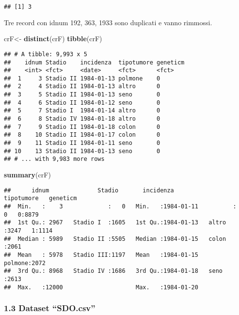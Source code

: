 \documentclass[]{article}
\newenvironment{Shaded}{\begin{snugshade}}{\end{snugshade}}
\newcommand{\KeywordTok}[1]{\textcolor[rgb]{0.13,0.29,0.53}{\textbf{#1}}}
\newcommand{\NormalTok}[1]{#1}
\newcommand{\StringTok}[1]{\textcolor[rgb]{0.31,0.60,0.02}{#1}}
\begin{document}
\begin{verbatim}
## [1] 3
\end{verbatim}

Tre record con idnum 192, 363, 1933 sono duplicati e vanno rimmossi.

\begin{Shaded}
\begin{Highlighting}[]
\NormalTok{crF<-}\StringTok{ }\KeywordTok{distinct}\NormalTok{(crF)}
\KeywordTok{tibble}\NormalTok{(crF)}
\end{Highlighting}
\end{Shaded}

\begin{verbatim}
## # A tibble: 9,993 x 5
##    idnum Stadio    incidenza  tipotumore geneticm
##    <int> <fct>     <date>     <fct>      <fct>   
##  1     3 Stadio II 1984-01-13 polmone    0       
##  2     4 Stadio II 1984-01-13 altro      0       
##  3     5 Stadio II 1984-01-13 seno       0       
##  4     6 Stadio II 1984-01-12 seno       0       
##  5     7 Stadio I  1984-01-14 altro      0       
##  6     8 Stadio IV 1984-01-18 altro      0       
##  7     9 Stadio II 1984-01-18 colon      0       
##  8    10 Stadio II 1984-01-17 colon      0       
##  9    11 Stadio II 1984-01-11 seno       0       
## 10    13 Stadio II 1984-01-13 seno       0       
## # ... with 9,983 more rows
\end{verbatim}

\begin{Shaded}
\begin{Highlighting}[]
\KeywordTok{summary}\NormalTok{(crF)}
\end{Highlighting}
\end{Shaded}

\begin{verbatim}
##      idnum              Stadio       incidenza            tipotumore   geneticm
##  Min.   :    3             :   0   Min.   :1984-01-11          :   0   0:8879  
##  1st Qu.: 2967   Stadio I  :1605   1st Qu.:1984-01-13   altro  :3247   1:1114  
##  Median : 5989   Stadio II :5505   Median :1984-01-15   colon  :2061           
##  Mean   : 5978   Stadio III:1197   Mean   :1984-01-15   polmone:2072           
##  3rd Qu.: 8968   Stadio IV :1686   3rd Qu.:1984-01-18   seno   :2613           
##  Max.   :12000                     Max.   :1984-01-20
\end{verbatim}

\hypertarget{dataset-sdo.csv}{%
\subsubsection{1.3 Dataset ``SDO.csv''}\label{dataset-sdo.csv}}
\end{document}
